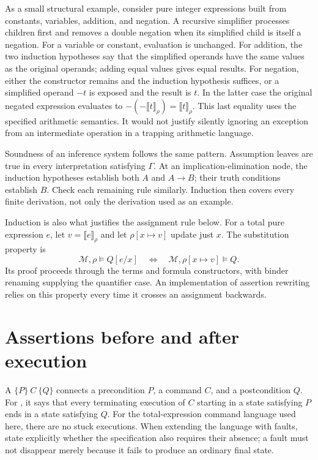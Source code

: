 As a small structural example, consider pure integer expressions built from constants, variables, addition, and negation.
A recursive simplifier processes children first and removes a double negation when its simplified child is itself a negation.
For a variable or constant, evaluation is unchanged.
For addition, the two induction hypotheses say that the simplified operands have the same values as the original operands; adding equal values gives equal results.
For negation, either the constructor remains and the induction hypothesis suffices, or a simplified operand $-t$ is exposed and the result is $t$.
In the latter case the original negated expression evaluates to $-(-\llbracket t\rrbracket_\rho)=\llbracket t\rrbracket_\rho$.
This last equality uses the specified arithmetic semantics.
It would not justify silently ignoring an exception from an intermediate operation in a trapping arithmetic language.

Soundness of an inference system follows the same pattern.
Assumption leaves are true in every interpretation satisfying $\Gamma$.
At an implication-elimination node, the induction hypotheses establish both $A$ and $A\rightarrow B$; their truth conditions establish $B$.
Check each remaining rule similarly.
Induction then covers every finite derivation, not only the derivation used as an example.

Induction is also what justifies the assignment rule below.
For a total pure expression $e$, let $v=\llbracket e\rrbracket_\rho$ and let $\rho[x\mapsto v]$ update just $x$.
The substitution property is
\[
  \mathcal M,\rho\models Q[e/x]
  \quad\Longleftrightarrow\quad
  \mathcal M,\rho[x\mapsto v]\models Q.
\]
Its proof proceeds through the terms and formula constructors, with binder renaming supplying the quantifier case.
An implementation of assertion rewriting relies on this property every time it crosses an assignment backwards.

\section{Assertions before and after execution}
\label{sec:ch40-hoare}

A  $\{P\}\ C\ \{Q\}$ connects a precondition $P$, a command $C$, and a postcondition $Q$.
For , it says that every terminating execution of $C$ starting in a state satisfying $P$ ends in a state satisfying $Q$.
For the total-expression command language used here, there are no stuck executions.
When extending the language with faults, state explicitly whether the specification also requires their absence; a fault must not disappear merely because it fails to produce an ordinary final state.

